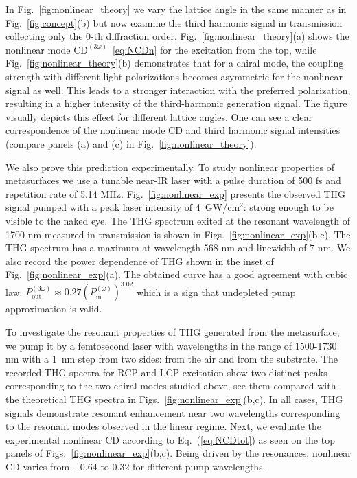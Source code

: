 \documentclass[
    reprint,
    superscriptaddress,
    a4paper,
    amsmath,amssymb,
    prl,
]{revtex4-2}
\begin{document}
In Fig.~\ref{fig:nonlinear_theory} we vary the lattice angle in the same manner as in Fig.~\ref{fig:concept}{(b)} but now examine the third harmonic signal in transmission collecting only the $0$-th diffraction order. 
Fig.~\ref{fig:nonlinear_theory}{(a)} shows the  nonlinear mode $\mathrm{CD}^{(3\omega)}$~\eqref{eq:NCDn} for the excitation from the top, while
Fig.~\ref{fig:nonlinear_theory}{(b)} demonstrates that for a chiral mode, the coupling strength with different light polarizations becomes asymmetric for the nonlinear signal as well. 
This leads to a stronger interaction with the preferred polarization, resulting in a higher intensity of the third-harmonic generation signal. The figure visually depicts this effect for different lattice angles.
One can see a clear correspondence of the nonlinear mode CD and third harmonic signal intensities (compare panels (a) and {(c)} in Fig.~\ref{fig:nonlinear_theory}). 



We also prove this prediction experimentally. To study nonlinear properties of metasurfaces we use a tunable near-IR laser with a pulse duration of 500 fs and repetition rate of 5.14 MHz. Fig.~\ref{fig:nonlinear_exp} presents the observed THG signal pumped with a peak laser intensity of 4~GW/cm$^2$: strong enough to be visible to the naked eye. The THG spectrum exited at the resonant wavelength of 1700 nm measured in transmission is shown in Figs.~\ref{fig:nonlinear_exp}{(b,c)}. The THG spectrum has a maximum at wavelength 568 nm and linewidth of 7 nm. We also record the power dependence of THG shown in the inset of Fig.~\ref{fig:nonlinear_exp}(a). The obtained curve has a good agreement with cubic law: $P_{\text{out}}^{(3\omega)} \approx 0.27 (P_{\text{in}}^{(\omega)} )^{3.02}$ which is a sign that undepleted pump approximation is valid.


To investigate the resonant properties of THG generated from the metasurface, we pump it by a femtosecond laser with wavelengths in the range of 1500-1730 nm with a 1~nm step from two sides: from the air and from the substrate. The recorded THG spectra for RCP and LCP excitation show two distinct peaks corresponding to the two chiral modes studied above, see them compared with the theoretical THG spectra in Figs.~\ref{fig:nonlinear_exp}(b,c). In all cases, THG signals demonstrate resonant enhancement near two wavelengths corresponding to the resonant modes observed in the linear regime. Next, we evaluate the experimental nonlinear CD according to Eq.~(\ref{eq:NCDtot}) as seen on the top panels of Figs.~\ref{fig:nonlinear_exp}(b,c). Being driven by the resonances, nonlinear CD varies from $-0.64$ to $0.32$ for different pump wavelengths. 
\end{document}
